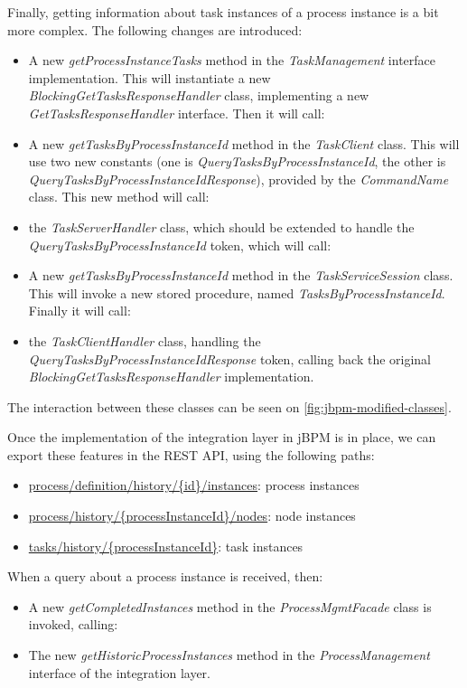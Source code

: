 Finally, getting information about task instances of a process instance is a
bit more complex. The following changes are introduced:

\begin{itemize}
\item A new \emph{getProcessInstanceTasks} method in the \emph{TaskManagement}
	interface implementation. This will instantiate a new
	\emph{BlockingGetTasksResponseHandler} class, implementing a new
	\emph{GetTasksResponseHandler} interface. Then it will call:
\item A new \emph{getTasksByProcessInstanceId} method in the \emph{TaskClient} class. This will use two new constants (one is \emph{QueryTasksByProcessInstanceId}, the other is \emph{QueryTasksByProcessInstanceIdResponse}), provided by the \emph{CommandName} class. This new method will call:
\item the \emph{TaskServerHandler} class, which should be extended to handle the \emph{QueryTasksByProcessInstanceId} token, which will call:
\item A new \emph{getTasksByProcessInstanceId} method in the \emph{TaskServiceSession} class. This will invoke a new stored procedure, named \emph{TasksByProcessInstanceId}. Finally it will call:
\item the \emph{TaskClientHandler} class, handling the \emph{QueryTasksByProcessInstanceIdResponse} token, calling back the original \emph{BlockingGetTasksResponseHandler} implementation.
\end{itemize}

The interaction between these classes can be seen on \autoref{fig:jbpm-modified-classes}.


Once the implementation of the integration layer in jBPM is in place, we can
export these features in the REST API, using the following paths:

\begin{itemize}
\item \url{process/definition/history/{id}/instances}: process instances
\item \url{process/history/{processInstanceId}/nodes}: node instances
\item \url{tasks/history/{processInstanceId}}: task instances
\end{itemize}

When a query about a process instance is received, then:

\begin{itemize}
\item A new \emph{getCompletedInstances} method in the \emph{ProcessMgmtFacade} class is invoked, calling:
\item The new \emph{getHistoricProcessInstances} method in the \emph{ProcessManagement} interface of the integration layer.
\end{itemize}

